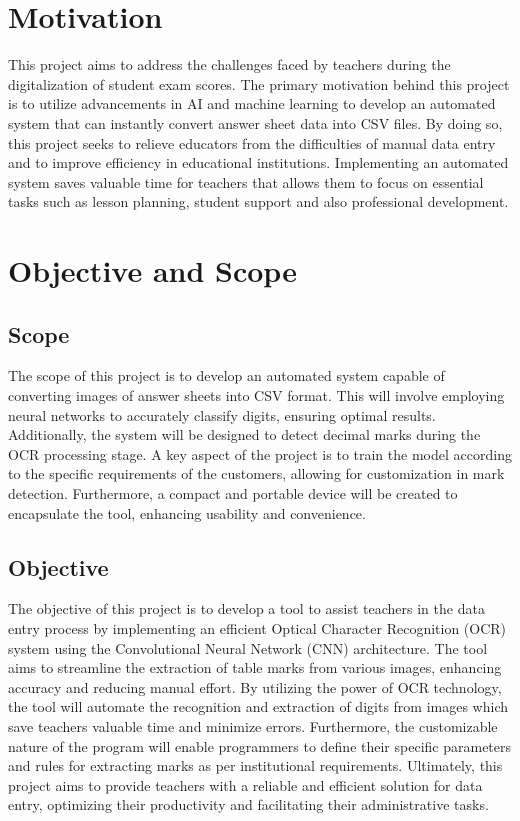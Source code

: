 \section{Motivation}
\noindent This project aims to address the challenges faced by teachers during the digitalization of student exam scores. The primary motivation behind this project is to utilize advancements in AI and machine learning to develop an automated system that can instantly convert answer sheet data into CSV files. By doing so, this project seeks to relieve educators from the difficulties of manual data entry and to improve efficiency in educational institutions. Implementing an automated system saves valuable time for teachers that allows them to focus on essential tasks such as lesson planning, student support and also professional development.



\section{Objective and Scope}
\subsection{Scope}

The scope of this project is to develop an automated system capable of converting images of answer sheets into CSV format. This will involve employing neural networks to accurately classify digits, ensuring optimal results. Additionally, the system will be designed to detect decimal marks during the OCR processing stage. A key aspect of the project is to train the model according to the specific requirements of the customers, allowing for customization in mark detection. Furthermore, a compact and portable device will be created to encapsulate the tool, enhancing usability and convenience.

\subsection{Objective}
The objective of this project is to develop a tool to assist teachers in the data entry process by implementing an efficient Optical Character Recognition (OCR) system using the Convolutional Neural Network (CNN) architecture. The tool aims to streamline the extraction of table marks from various images, enhancing accuracy and reducing manual effort. By utilizing the power of OCR technology, the tool will automate the recognition and extraction of digits from images which save teachers valuable time and minimize errors. Furthermore, the customizable nature of the program will enable programmers to define their specific parameters and rules for extracting marks as per institutional requirements. Ultimately, this project aims to provide teachers with a reliable and efficient solution for data entry, optimizing their productivity and facilitating their administrative tasks.

